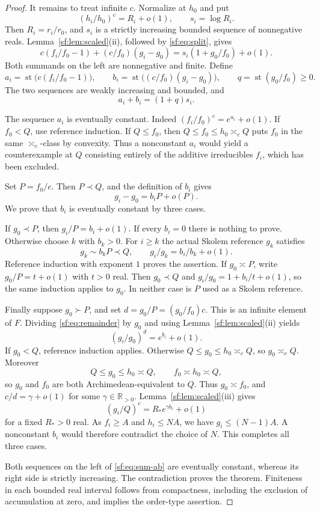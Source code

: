 \documentclass[10pt,a4paper]{amsart}
\newcommand{\R}{\mathbb R}
\newcommand{\arch}{\mathrel{\asymp}}
\newcommand{\st}{\operatorname{st}}
\begin{document}
\begin{proof}
It remains to treat infinite $c$. Normalize at $h_0$ and put
\[
 (h_i/h_0)^c=R_i+o(1),\qquad s_i=\log R_i.
\]
Then $R_i=r_i/r_0$, and $s_i$ is a strictly increasing bounded
sequence of nonnegative reals. Lemma~\ref{sf:lem:scaled}(ii), followed
by \eqref{sf:eq:split}, gives
\[
 c(f_i/f_0-1)+(c/f_0)(g_i-g_0)
       =s_i(1+g_0/f_0)+o(1).
\]
Both summands on the left are nonnegative and finite. Define
\begin{equation}
 a_i=\st\bigl(c(f_i/f_0-1)\bigr),\qquad
 b_i=\st\bigl((c/f_0)(g_i-g_0)\bigr),\qquad
 q=\st(g_0/f_0)\ge0.
 \label{sf:eq:ab}
\end{equation}
The two sequences are weakly increasing and bounded, and
\begin{equation}
 a_i+b_i=(1+q)s_i.\label{sf:eq:sum-ab}
\end{equation}

The sequence $a_i$ is eventually constant. Indeed
$(f_i/f_0)^c=e^{a_i}+o(1)$. If $f_0<Q$, use reference induction.
If $Q\le f_0$, then $Q\le f_0\le h_0\arch_c Q$ puts $f_0$
in the same $\arch_c$-class by convexity. Thus a nonconstant
$a_i$ would yield a counterexample at $Q$ consisting entirely of
the additive irreducibles $f_i$, which has been excluded.

Set $P=f_0/c$. Then $P\prec Q$, and the definition of $b_i$ gives
\begin{equation}
 g_i-g_0=b_iP+o(P).\label{sf:eq:remainder}
\end{equation}
We prove that $b_i$ is eventually constant by three cases.

If $g_0\prec P$, then $g_i/P=b_i+o(1)$. If every $b_i=0$
there is nothing to prove. Otherwise choose $k$ with $b_k>0$.
For $i\ge k$ the actual Skolem reference $g_k$ satisfies
\[
 g_k\sim b_kP\prec Q,\qquad
 g_i/g_k=b_i/b_k+o(1).
\]
Reference induction with exponent $1$ proves the assertion.
If $g_0\arch P$, write $g_0/P=t+o(1)$ with $t>0$ real.
Then $g_0\prec Q$ and
$g_i/g_0=1+b_i/t+o(1)$, so the same induction applies to $g_0$.
In neither case is $P$ used as a Skolem reference.

Finally suppose $g_0\succ P$, and set $d=g_0/P=(g_0/f_0)c$.
This is an infinite element of $F$. Dividing \eqref{sf:eq:remainder}
by $g_0$ and using Lemma~\ref{sf:lem:scaled}(ii) yields
\[
 (g_i/g_0)^d=e^{b_i}+o(1).
\]
If $g_0<Q$, reference induction applies. Otherwise
$Q\le g_0\le h_0\arch_c Q$, so $g_0\arch_c Q$.
Moreover
\[
 Q\le g_0\le h_0\arch Q,\qquad f_0\arch h_0\arch Q,
\]
so $g_0$ and $f_0$ are both Archimedean-equivalent to $Q$.
Thus $g_0\arch f_0$, and $c/d=\gamma+o(1)$ for some
$\gamma\in\R_{>0}$. Lemma~\ref{sf:lem:scaled}(iii) gives
\[
 (g_i/Q)^c=R_*e^{\gamma b_i}+o(1)
\]
for a fixed $R_*>0$ real. As $f_i\ge A$ and $h_i\le NA$,
we have $g_i\le(N-1)A$. A nonconstant $b_i$ would therefore
contradict the choice of $N$. This completes all three cases.

Both sequences on the left of \eqref{sf:eq:sum-ab} are eventually
constant, whereas its right side is strictly increasing. The
contradiction proves the theorem. Finiteness in each bounded real
interval follows from compactness, including the exclusion of
accumulation at zero, and implies the order-type assertion.
\end{proof}
\end{document}
